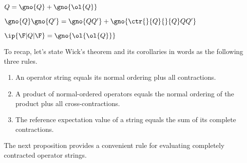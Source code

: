 \begin{thm}\label{wicks-theorem}
 $Q=\gno{Q}+\gno{\ol{Q}}$\vspace{5pt}
\end{thm}


\begin{cor}\label{wick-operator-product}
\vspace{5pt}
$\gno{Q}\gno{Q'}=\gno{QQ'}+\gno{\ctr{}{Q}{}{Q}  QQ'}$
\end{cor}

\begin{cor}\label{wick-expectation-value}
\vspace{5pt}
$\ip{\F|Q|\F}=\gno{\ol{\ol{Q}}}$
\end{cor}

\begin{rmk}
To recap, let's state Wick's theorem and its corollaries in words as the following three rules.
\begin{enumerate}
\item
  An operator string equals its normal ordering plus all contractions.
\item
  A product of normal-ordered operators equals the normal ordering of the product plus all cross-contractions.
\item
  The reference expectation value of a string equals the sum of its complete contractions.
\end{enumerate}
The next proposition provides a convenient rule for evaluating completely
contracted operator strings.
\end{rmk}

